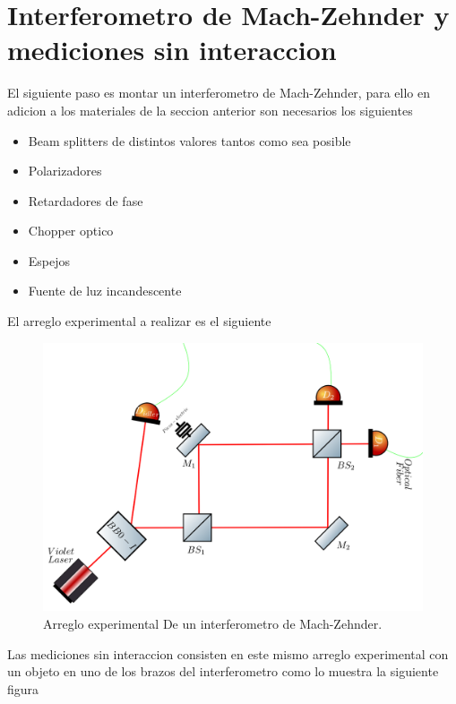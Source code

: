 \documentclass[11pt]{article}
\begin{document}
\section{Interferometro de Mach-Zehnder y mediciones sin interaccion}


El siguiente paso es montar un interferometro de Mach-Zehnder, para ello en adicion a los materiales de la seccion anterior son necesarios los siguientes

\begin{itemize}
\item Beam splitters de distintos valores tantos como sea posible
\item Polarizadores
\item Retardadores de fase
\item Chopper optico
\item Espejos
\item Fuente de luz incandescente
\end{itemize}

El arreglo experimental a realizar es el siguiente


\begin{figure}[H]
\centering
\includegraphics[scale=0.5]{images/machzehnder_single.png}
\caption{Arreglo experimental De un interferometro de Mach-Zehnder.}
\label{fig:SPDC3}
\end{figure}

Las mediciones sin interaccion consisten en este mismo arreglo experimental con un objeto en uno de los brazos del interferometro como lo muestra la siguiente figura
\end{document}
